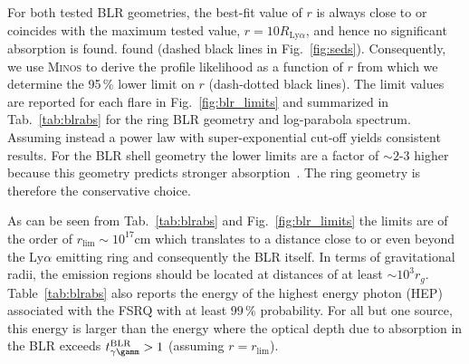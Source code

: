 \documentclass[twocolumn,linenumbers]{aastex62}
\begin{document}
For both tested BLR geometries, the best-fit value of $r$ is always close to or coincides with the maximum tested value, $r = 10R_{\mathrm{Ly}\alpha}$, and hence no significant absorption is found. found (dashed black lines in Fig.~\ref{fig:seds}). Consequently,  we use \textsc{Minos} to derive the profile likelihood as a function of $r$ from which we determine the 95\,\% lower limit on $r$ (dash-dotted black lines). 
The limit values are reported for each flare in Fig.~\ref{fig:blr_limits} and  summarized in Tab.~\ref{tab:blrabs} for the ring BLR geometry and log-parabola spectrum.
Assuming instead a power law with super-exponential cut-off yields consistent results. 
For the BLR shell geometry the lower limits are a factor of $\sim2$-$3$ higher because this geometry predicts stronger absorption~\citep{finke2016}. The ring geometry is therefore the conservative choice. 

As can be seen from Tab.~\ref{tab:blrabs} and Fig.~\ref{fig:blr_limits} the limits are of the order of $r_\mathrm{lim}\sim10^{17}$cm which translates to a distance close to or even beyond the Ly$\alpha$ emitting ring and consequently the BLR itself. In terms of gravitational radii, the emission regions should be located at distances of at least $\sim10^3r_g$. 
Table~\ref{tab:blrabs} also reports the energy of the highest energy photon (HEP) associated with the FSRQ with at least $99\,\%$ probability. For all but one source, this energy is larger than the energy where the optical depth due to absorption in the BLR exceeds $t_{\gamma\gamm}^\mathrm{BLR} > 1$ (assuming $r = r_\mathrm{lim}$). 
\end{document}
